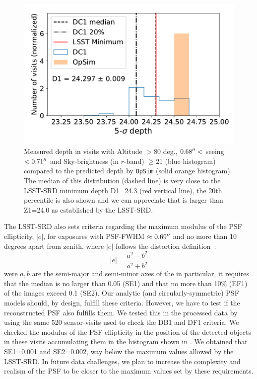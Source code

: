 \documentclass[twocolumn]{aastex62}
\begin{document}
\begin{figure}
\centering
\includegraphics[width=0.9\columnwidth]{m5_goals}
\caption{Measured depth in visits with Altitude $>80$ deg., $0.68 \mbox{$^{\prime\prime}$} <$ seeing $ < 0.71 \mbox{$^{\prime\prime}$}$ and Sky-brightness (in $r$-band) $\geq 21$ (blue histogram) compared to the predicted depth by \texttt{OpSim} (solid orange histogram). The median of this distribution (dashed line) is very close to the LSST-SRD minimum depth D1=24.3 (red vertical line), the 20th percentile is also shown and we can appreciate that is larger than Z1=24.0 as established by the LSST-SRD.}
\label{fig:DF1_checks}
\end{figure}

The LSST-SRD also sets criteria regarding the maximum modulus of the PSF ellipticity, $|e|$,
for exposures with PSF-FWHM $\approx 0.69\mbox{$^{\prime\prime}$}$ and no more than 10 degrees apart from zenith, where $|e|$ follows the distortion definition~\citep{1991ApJ...380....1M}:
\begin{equation}
|e| = \frac{a^{2} - b^{2}}{a^{2}+b^{2}}
\end{equation}
were $a, b$ are the semi-major and semi-minor axes of the 
in particular, it requires that the median is no larger than 0.05 (SE1) and that no more than 10\% (EF1) of the images exceed 0.1 (SE2). Our analytic (and circularly-symmetric) PSF models should, by design, fulfill these criteria. However, we have to test if the reconstructed PSF also fulfills them. We tested this in the processed data by using the same 520 sensor-visits used to check the DB1 and DF1 criteria. We checked the modulus of the PSF ellipticity in the position of the detected objects in these visits accumulating them in the histogram shown in . We obtained that SE1=0.001 and SE2=0.002, way below the maximum values allowed by the LSST-SRD. In future data challenges, we plan to increase the complexity and realism of the PSF to be closer to the maximum values set by these requirements.
\end{document}
